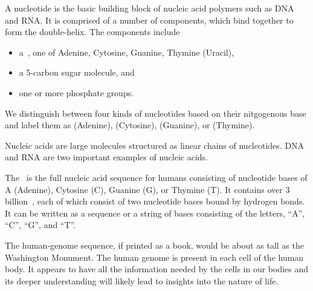 \begin{definition}[Nucleotide]
A nucleotide is the basic building block of nucleic acid polymers such
as DNA and RNA. 
%
It is comprised of a number of components, which bind together to form
the double-helix.
%
The components include 
\begin{itemize}
\item a~, one of Adenine,
Cytosine, Guanine, Thymine (Uracil), 

\item a 5-carbon sugar molecule, and
\item one or more phosphate groups.
\end{itemize}
%
We distinguish between four kinds of nucleotides based on their
nitgogenous base and label them as  (Adenine), 
(Cytosine),  (Guanine), or  (Thymine).
\end{definition}

\begin{definition}
Nucleic acids are large molecules structured as linear chains of
nucleotides.  DNA and RNA are two important examples of nucleic acids.
\end{definition}

\begin{definition}

The~ is the full nucleic acid sequence for humans
consisting of nucleotide bases of A (Adenine), Cytosine (C),
Guanine (G), or Thymine (T).
%
It contains over $3$ billion~, each of which consist
of two nucleotide bases bound by hydrogen bonds.
%
It can be written as a sequence or a string of bases consisting of the
letters, ``A'', ``C'', ``G'', and ``T''.
%
\end{definition}

\begin{remark}
The human-genome sequence, if printed as a book, would be
about as tall as the Washington Monument.
%
The human genome is present in each cell of the human body. 
%
It appears to have all the information needed by the cells in our
bodies and its deeper understanding will likely lead to insights into
the nature of life.
\end{remark}

